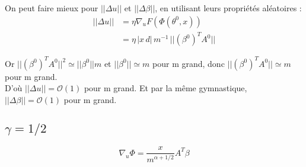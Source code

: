 \documentclass[a4paper, 11pt, french]{article}
\begin{document}
	On peut faire mieux pour $||\Delta u||$ et $||\Delta \beta||$, en utilisant leurs propriétés aléatoires :
	\begin{align*}
		||\Delta u|| &=  \eta \nabla_u F(\Phi(\theta^0, x)) \\
		&= \eta \, |x \, d| \, m^{-1} \, ||(\beta^0)^T A^0||
	\end{align*}
	
	Or $||(\beta^0)^T A^0||^2 \simeq ||\beta^0||m$ et $||\beta^0|| \simeq m$ pour m grand, donc $||(\beta^0)^T A^0|| \simeq m$ pour m grand.\\
	
	D'où $ ||\Delta u|| = \mathcal{O}(1) $ pour m grand. Et par la même gymnastique, $ ||\Delta \beta|| = \mathcal{O}(1) $ pour m grand.
	
	\newpage
	
	\subsection{$\gamma = 1/2$}
	
	\[\nabla_u \Phi = \frac{x}{m^{\alpha + 1/2}} A^T \beta\]
	
\end{document}
